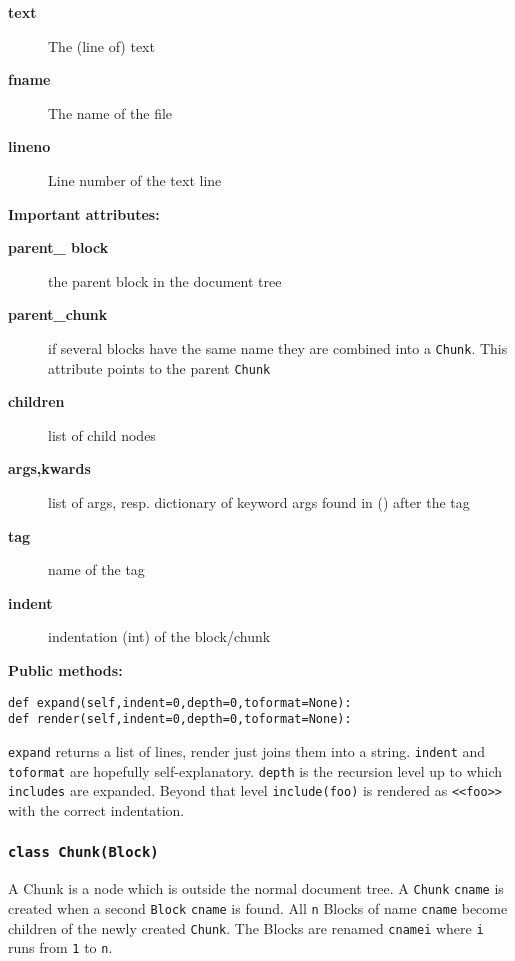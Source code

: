 \documentclass[neutral,proc,reqno]{ml-gen}
\begin{document}
\begin{description}
\item[\textbf{text}]
The (line of) text
\item[\textbf{fname}]
The name of the file
\item[\textbf{lineno}]
Line number of the text line
\end{description}
\textbf{Important attributes:}

\begin{description}
\item[\textbf{parent\_ block}]
the parent block in the document tree

\item[\textbf{parent\_chunk}]
if several blocks have the same name they are combined into a
\lstinline!Chunk!. This attribute points to the parent \lstinline!Chunk!

\item[\textbf{children}]
list of child nodes

\item[\textbf{args,kwards}]
list of args, resp. dictionary of keyword args found in () after the tag

\item[\textbf{tag}]
name of the tag

\item[\textbf{indent}]
indentation (int) of the block/chunk

\end{description}
\textbf{Public methods:}

\begin{lstlisting}
def expand(self,indent=0,depth=0,toformat=None):
def render(self,indent=0,depth=0,toformat=None):
\end{lstlisting}
\lstinline!expand! returns a list of lines, render just joins them into
a string. \lstinline!indent! and \lstinline!toformat! are hopefully
self-explanatory. \lstinline!depth! is the recursion level up to which
\lstinline!includes! are expanded. Beyond that level
\lstinline!include(foo)! is rendered as \lstinline!<<foo>>! with the
correct indentation.

\subsubsection{\lstinline!class Chunk(Block)!}

A Chunk is a node which is outside the normal document tree. A
\lstinline!Chunk! \lstinline!cname! is created when a second
\lstinline!Block! \lstinline!cname! is found. All \lstinline!n! Blocks
of name \lstinline!cname! become children of the newly created
\lstinline!Chunk!. The Blocks are renamed \lstinline!cnamei! where
\lstinline!i! runs from \lstinline!1! to \lstinline!n!.
\end{document}
